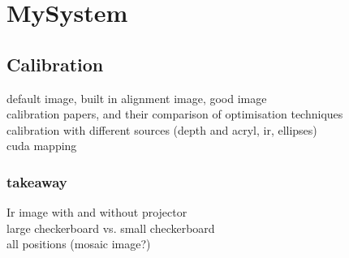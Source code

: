 \section{MySystem}

\subsection{Calibration}
default image, built in alignment image, good image\\
calibration papers, and their comparison of optimisation techniques\\
calibration with different sources (depth and acryl, ir, ellipses)\\
cuda mapping\\
\subsubsection{takeaway}
Ir image with and without projector\\
large checkerboard vs. small checkerboard\\
all positions (mosaic image?)\\
